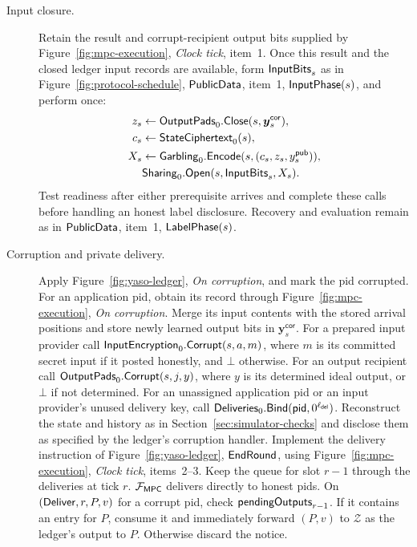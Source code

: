 \begin{description}
\item[Input closure.]
 Retain the result and corrupt-recipient output bits supplied by
 Figure~\ref{fig:mpc-execution}, \emph{Clock tick}, item~1.
 Once this result and the closed ledger input records are available,
 form $\mathsf{InputBits}_s$ as in Figure~\ref{fig:protocol-schedule},
 $\mathsf{PublicData}$, item~1, $\mathsf{InputPhase}(s)$, and perform once:
 \[
 \begin{aligned}
 z_s&\gets\mathsf{OutputPads}_0.\mathsf{Close}(s,\boldsymbol y_s^{\mathsf{cor}}),\\
 c_s&\gets\mathsf{StateCiphertext}_0(s),\\
 X_s&\gets\mathsf{Garbling}_0.\mathsf{Encode}(s,(c_s,z_s,y^{\mathsf{pub}}_s)),\\
 &\mathsf{Sharing}_0.\mathsf{Open}(s,\mathsf{InputBits}_s,X_s).
 \end{aligned}
 \]
 Test readiness after either prerequisite arrives and complete these
 calls before handling an honest label disclosure.  Recovery and
 evaluation remain as in $\mathsf{PublicData}$, item~1, $\mathsf{LabelPhase}(s)$.

\item[Corruption and private delivery.]
 Apply Figure~\ref{fig:yaso-ledger}, \emph{On corruption}, and mark
 the pid corrupted.  For an application pid, obtain its record through
 Figure~\ref{fig:mpc-execution}, \emph{On corruption}.  Merge its input
 contents with the stored arrival positions and store newly learned
 output bits in $\boldsymbol y_s^{\mathsf{cor}}$.
 For a prepared input provider call
 $\mathsf{InputEncryption}_0.\mathsf{Corrupt}(s,a,m)$, where $m$ is its committed secret
 input if it posted honestly, and $\bot$ otherwise.
 For an output recipient call $\mathsf{OutputPads}_0.\mathsf{Corrupt}(s,j,y)$, where
 $y$ is its determined ideal output, or $\bot$ if not determined.
 For an unassigned application pid or an input provider's unused
 delivery key, call $\mathsf{Deliveries}_0.\mathsf{Bind}(\mathsf{pid},0^{\ell_{\mathsf{del}}})$.
 Reconstruct the state and history as in Section~\ref{sec:simulator-checks}
 and disclose them as specified by the ledger's corruption handler.
 Implement the delivery instruction of Figure~\ref{fig:yaso-ledger},
 $\mathsf{EndRound}$, using Figure~\ref{fig:mpc-execution}, \emph{Clock tick},
 items~2--3.  Keep the queue for slot $r-1$ through the deliveries at
 tick $r$.  $\mathcal F_{\mathsf{MPC}}$ delivers directly to honest pids.  On
 $(\mathsf{Deliver},r,P,v)$ for a corrupt pid, check $\mathsf{pendingOutputs}_{r-1}$.
 If it contains an entry for $P$, consume it and immediately forward
 $(P,v)$ to $\mathcal Z$ as the ledger's output to $P$.
 Otherwise discard the notice.
\end{description}

